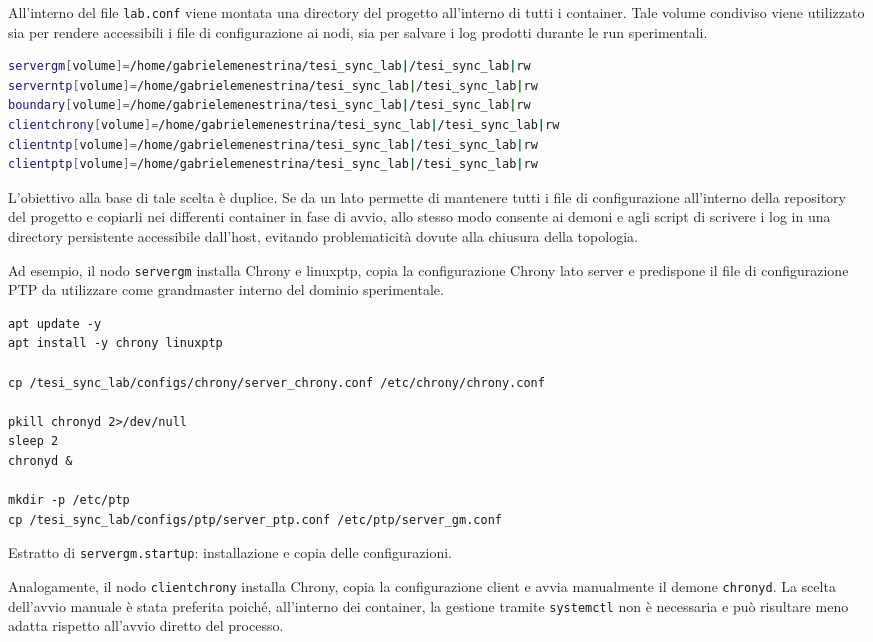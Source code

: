 All'interno del file \texttt{lab.conf} viene montata una directory del progetto all'interno
di tutti i container. Tale volume condiviso viene utilizzato sia per rendere
accessibili i file di configurazione ai nodi, sia per salvare i log prodotti durante
le run sperimentali.

\begin{lstlisting}[language=bash,caption={Estratto del file \texttt{lab.conf}: volume condiviso tra host e container.},label={lst:labconf_volume}]
servergm[volume]=/home/gabrielemenestrina/tesi_sync_lab|/tesi_sync_lab|rw
serverntp[volume]=/home/gabrielemenestrina/tesi_sync_lab|/tesi_sync_lab|rw
boundary[volume]=/home/gabrielemenestrina/tesi_sync_lab|/tesi_sync_lab|rw
clientchrony[volume]=/home/gabrielemenestrina/tesi_sync_lab|/tesi_sync_lab|rw
clientntp[volume]=/home/gabrielemenestrina/tesi_sync_lab|/tesi_sync_lab|rw
clientptp[volume]=/home/gabrielemenestrina/tesi_sync_lab|/tesi_sync_lab|rw
\end{lstlisting}

L'obiettivo alla base di tale scelta è duplice. Se da un lato permette di mantenere
tutti i file di configurazione all'interno della repository del progetto e copiarli
nei differenti container in fase di avvio, allo stesso modo consente ai demoni e
agli script di scrivere i log in una directory persistente accessibile dall'host,
evitando problematicità dovute alla chiusura della topologia.

Ad esempio, il nodo \texttt{servergm} installa Chrony e linuxptp, copia la
configurazione Chrony lato server e predispone il file di configurazione PTP da
utilizzare come grandmaster interno del dominio sperimentale.

\begin{listing}[H]
\begin{verbatim}
apt update -y
apt install -y chrony linuxptp

cp /tesi_sync_lab/configs/chrony/server_chrony.conf /etc/chrony/chrony.conf

pkill chronyd 2>/dev/null
sleep 2
chronyd &

mkdir -p /etc/ptp
cp /tesi_sync_lab/configs/ptp/server_ptp.conf /etc/ptp/server_gm.conf
\end{verbatim}
\caption{Estratto di \texttt{servergm.startup}: installazione e copia delle configurazioni.}
\label{lst:servergm_startup}
\end{listing}

Analogamente, il nodo \texttt{clientchrony} installa Chrony, copia la
configurazione client e avvia manualmente il demone \texttt{chronyd}. La scelta
dell'avvio manuale è stata preferita poiché, all'interno dei container, la
gestione tramite \texttt{systemctl} non è necessaria e può risultare meno adatta rispetto
all'avvio diretto del processo.

